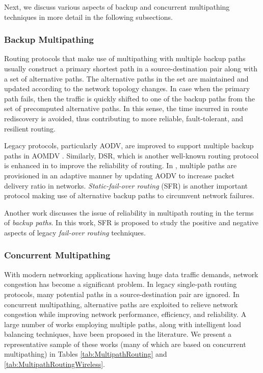 \documentclass[10pt]{IEEEtran}
\begin{document}
Next, we discuss various aspects of backup and concurrent multipathing techniques in more detail in the following subsections.

\vspace{2mm}
\subsubsection{Backup Multipathing}
\label{subsec:backup mp}

Routing protocols that make use of multipathing with multiple backup paths usually construct a primary shortest path in a source-destination pair along with a set of alternative paths. The alternative paths in the set are maintained and updated according to the network topology changes. In case when the primary path fails, then the traffic is quickly shifted to one of the backup paths from the set of precomputed alternative paths. In this sense, the time incurred in route rediscovery is avoided, thus contributing to more reliable, fault-tolerant, and resilient routing.

Legacy protocols, particularly AODV, are improved to support multiple backup paths in AOMDV \cite{marina2001demand}. Similarly, DSR, which is another well-known routing protocol is enhanced in \cite{nasipuri1999demand} to improve the reliability of routing. In \cite{sambasivam2004dynamically}, multiple paths are provisioned in an adaptive manner by updating AODV to increase packet delivery ratio in networks. \textit{Static-fail-over routing} (SFR) is another important protocol making use of alternative backup paths to circumvent network failures.

Another work \cite{chiesa2014exploring} discusses the issue of reliability in multipath routing in the terms of \textit{backup paths}. In this work, SFR is proposed to study the positive and negative aspects of legacy \textit{fail-over routing} techniques. 


\vspace{2mm}
\subsubsection{Concurrent Multipathing}
\label{subsec:concurrent mp}

With modern networking applications having huge data traffic demands, network congestion has become a significant problem. In legacy single-path routing protocols, many potential paths in a source-destination pair are ignored. In concurrent multipathing, alternative paths are exploited to relieve network congestion while improving network performance, efficiency, and reliability. 
A large number of works employing multiple paths, along with intelligent load balancing techniques, have been proposed in the literature. We present a representative sample of these works (many of which are based on concurrent multipathing) in Tables \ref{tab:MultipathRouting} and \ref{tab:MultipathRoutingWireless}.
\end{document}
